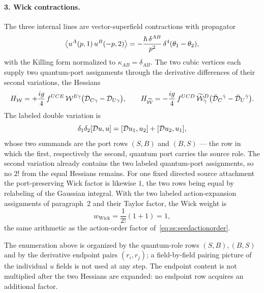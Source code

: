 \paragraph{3. Wick contractions.}
The three internal lines are vector-superfield contractions with propagator
\begin{equation}\label{eq:ss:seeduprop}
\big\langle u^{A}(p,1)\,u^{B}(-p,2)\big\rangle
=-\frac{\hbar\,\delta^{AB}}{p^{2}}\,\delta^{4}(\theta_1-\theta_2),
\end{equation}
with the Killing form normalized to $\kappa_{AB}=\delta_{AB}$. The two cubic
vertices each supply two quantum-port assignments through the derivative
differences of their second variations, the Hessians
\begin{equation}\label{eq:ss:seedhess}
H_{\mathcal{W}}=+\frac{ig}{4}\,f^{UCE}\,\mathcal{W}^{E\gamma}
\big(\mathcal{D}_{C\gamma}-\mathcal{D}_{U\gamma}\big),
\qquad
H_{\widetilde{\mathcal{W}}}=-\frac{ig}{4}\,f^{UCD}\,\widetilde{\mathcal{W}}^{D}_{\dot\gamma}
\big(\bar{\mathcal{D}}_{C}{}^{\dot\gamma}-\bar{\mathcal{D}}_{U}{}^{\dot\gamma}\big).
\end{equation}
The labeled double variation is
\begin{equation}\label{eq:ss:seedports}
\delta_1\delta_2[\mathcal{D} u,u]=[\mathcal{D} u_1,u_2]+[\mathcal{D} u_2,u_1],
\end{equation}
whose two summands are the port rows $(S,B)$ and $(B,S)$ --- the row in which
the first, respectively the second, quantum port carries the source role.
The second variation already contains the two labeled quantum-port
assignments, so no $2!$ from the equal Hessians remains. For one fixed
directed source attachment the port-preserving Wick factor is likewise $1$,
the two rows being equal by relabeling of the Gaussian integral. With the
two labeled action-expansion assignments of paragraph~2 and their Taylor
factor, the Wick weight is
\begin{equation}\label{eq:ss:wick}
w_{\mathrm{Wick}}=\frac{1}{2!}(1+1)=1 ,
\end{equation}
the same arithmetic as the action-order factor
of~\eqref{eq:ss:seedactionorder}.

\begin{remark}%
\label{rem:ss:seedwick}
The enumeration above is organized by the quantum-role rows $(S,B),(B,S)$
and by the derivative endpoint pairs $(r_i,r_j)$; a field-by-field pairing
picture of the individual $u$ fields is not used at any step. The endpoint
content is not multiplied after the two Hessians are expanded: no endpoint
row acquires an additional factor.
\end{remark}


